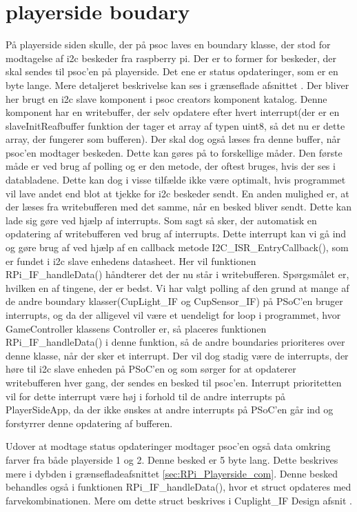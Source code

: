 \documentclass[Softwaredesign/Softwaredesign_main.tex]{subfiles}
\begin{document}
\section{playerside boudary}
På playerside siden skulle, der på psoc laves en boundary klasse, der stod for modtagelse af i2c beskeder fra raspberry pi. Der er to former for beskeder, der skal sendes til psoc'en på playerside. Det ene er status opdateringer, som er en byte lange. Mere detaljeret beskrivelse kan ses i grænseflade afsnittet . Der bliver her brugt en i2c slave komponent i psoc creators komponent katalog. Denne komponent har en writebuffer, der selv opdatere efter hvert interrupt(der er en slaveInitReafbuffer funktion der tager et array af typen uint8, så det nu er dette array, der fungerer som bufferen). Der skal dog også læses fra denne buffer, når psoc'en modtager beskeden. Dette kan gøres på to forskellige måder. Den første måde er ved brug af polling og er den metode, der oftest bruges, hvis der ses i databladene. Dette kan dog i visse tilfælde ikke være optimalt, hvis programmet vil lave andet end blot at tjekke for i2c beskeder sendt. En anden mulighed er, at der læses fra writebufferen med det samme, når en besked bliver sendt. Dette kan lade sig gøre ved hjælp af interrupts. Som sagt så sker, der automatisk en opdatering af writebufferen ved brug af interrupts. Dette interrupt kan vi gå ind og gøre brug af ved hjælp af en callback metode I2C\_ISR\_EntryCallback(), som er fundet i i2c slave enhedens datasheet. Her vil funktionen RPi\_IF\_handleData() håndterer det der nu står i writebufferen. Spørgsmålet er, hvilken en af tingene, der er bedst. Vi har valgt polling af den grund at mange af de andre boundary klasser(CupLight\_IF og CupSensor\_IF) på PSoC'en bruger interrupts, og da der alligevel vil være et uendeligt for loop i programmet, hvor GameController klassens Controller er, så placeres funktionen RPi\_IF\_handleData() i denne funktion, så de andre boundaries prioriteres over denne klasse, når der sker et interrupt. Der vil dog stadig være de interrupts, der høre til i2c slave enheden på PSoC'en og som sørger for at opdaterer writebufferen hver gang, der sendes en besked til psoc'en. Interrupt prioritetten vil for dette interrupt være høj i forhold til de andre interrupts på PlayerSideApp, da der ikke ønskes at andre interrupts på PSoC'en går ind og forstyrrer denne opdatering af bufferen.  

Udover at modtage status opdateringer modtager psoc'en også data omkring farver fra både playerside 1 og 2. Denne besked er 5 byte lang. Dette beskrives mere i dybden i grænsefladeafsnittet \ref{sec:RPi_Playerside_com}. Denne besked behandles også i funktionen  RPi\_IF\_handleData(), hvor et struct opdateres med farvekombinationen. Mere om dette struct beskrives i Cuplight\_IF Design afsnit . 
\end{document}
